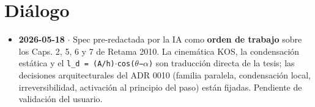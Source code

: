 \documentclass[11pt,letterpaper,oneside]{report}
\begin{document}
\section{Diálogo}

\begin{itemize}
  \item \textbf{2026-05-18} \ensuremath{\cdot} Spec pre-redactada por la IA como \textbf{orden de trabajo} sobre los Caps. 2, 5, 6 y 7 de Retama 2010. La cinemática KOS, la condensación estática y el \texttt{l\_d = (A/h)\ensuremath{\cdot}cos(\ensuremath{\theta}−\ensuremath{\alpha})} son traducción directa de la tesis; las decisiones arquitecturales del ADR 0010 (familia paralela, condensación local, irreversibilidad, activación al principio del paso) están fijadas. Pendiente de validación del usuario.
\end{itemize}
\end{document}
